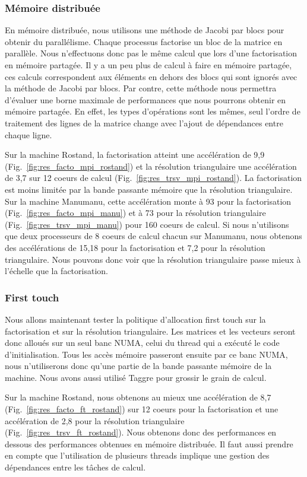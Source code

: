 \subsubsection{Mémoire distribuée}
En mémoire distribuée, nous utilisons une méthode de Jacobi par blocs pour obtenir du parallélisme.
%
Chaque processus factorise un bloc de la matrice en parallèle.
%
Nous n'effectuons donc pas le même calcul que lors d'une factorisation en mémoire partagée.
%
Il y a un peu plus de calcul à faire en mémoire partagée, ces calculs correspondent aux éléments en dehors des blocs qui sont ignorés avec la méthode de Jacobi par blocs.
%
Par contre, cette méthode nous permettra d'évaluer une borne maximale de performances que nous pourrons obtenir en mémoire partagée.
%
En effet, les types d'opérations sont les mêmes, seul l'ordre de traitement des lignes de la matrice change avec l'ajout de dépendances entre chaque ligne.


Sur la machine Rostand, la factorisation atteint une accélération de 9,9 (Fig.~\ref{fig:res_facto_mpi_rostand}) et la résolution triangulaire une accélération de 3,7 sur 12 coeurs de calcul (Fig.~\ref{fig:res_trsv_mpi_rostand}).
%
La factorisation est moins limitée par la bande passante mémoire que la résolution triangulaire.
%
Sur la machine Manumanu, cette accélération monte à 93 pour la factorisation (Fig.~\ref{fig:res_facto_mpi_manu}) et à 73 pour la résolution triangulaire (Fig.~\ref{fig:res_trsv_mpi_manu}) pour 160 coeurs de calcul.
%
Si nous n'utilisons que deux processeurs de 8 coeurs de calcul chacun sur Manumanu, nous obtenons des accélérations de 15,18 pour la factorisation et 7,2 pour la résolution triangulaire.
%
Nous pouvons donc voir que la résolution triangulaire passe mieux à l'échelle que la factorisation.


\subsubsection{First touch}
Nous allons maintenant tester la politique d'allocation first touch sur la factorisation et sur la résolution triangulaire.
%
Les matrices et les vecteurs seront donc alloués sur un seul banc NUMA, celui du thread qui a exécuté le code d'initialisation.
%
Tous les accès mémoire passeront ensuite par ce banc NUMA, nous n'utiliserons donc qu'une partie de la bande passante mémoire de la machine.
%
Nous avons aussi utilisé Taggre pour grossir le grain de calcul.


Sur la machine Rostand, nous obtenons au mieux une accélération de 8,7 (Fig.~\ref{fig:res_facto_ft_rostand}) sur 12 coeurs pour la factorisation et une accélération de 2,8 pour la résolution triangulaire (Fig.~\ref{fig:res_trsv_ft_rostand}).
%
Nous obtenons donc des performances en dessous des performances obtenues en mémoire distribuée.
%
Il faut aussi prendre en compte que l'utilisation de plusieurs threads implique une gestion des dépendances entre les tâches de calcul.


